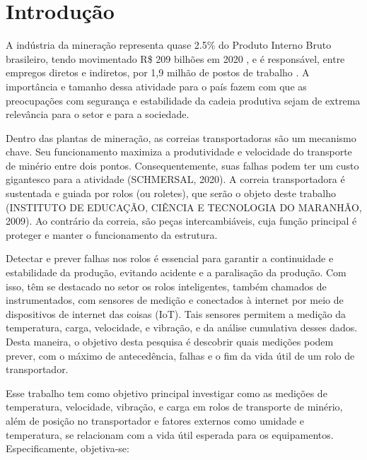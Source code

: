 
\chapter[Introdução]{Introdução}

A indústria da mineração representa quase 2.5\% do Produto Interno Bruto brasileiro, tendo movimentado R\$ 209 bilhões em 2020 \cite{governo2021}, e é responsável, entre empregos diretos e indiretos, por 1,9 milhão de postos de trabalho \cite{instituto2020}. A importância e tamanho dessa atividade para o país fazem com que as preocupações com segurança e estabilidade da cadeia produtiva sejam de extrema relevância para o setor e para a sociedade.\par
Dentro das plantas de mineração, as correias transportadoras são um mecanismo chave. Seu funcionamento maximiza a produtividade e velocidade do transporte de minério entre dois pontos. Consequentemente, suas falhas podem ter um custo gigantesco para a atividade (SCHMERSAL, 2020). A correia transportadora é sustentada e guiada por rolos (ou roletes), que serão o objeto deste trabalho (INSTITUTO DE EDUCAÇÃO, CIÊNCIA E TECNOLOGIA DO MARANHÃO, 2009). Ao contrário da correia, são peças intercambiáveis, cuja função principal é proteger e manter o funcionamento da estrutura.\par

Detectar e prever falhas nos rolos é essencial para garantir a continuidade e estabilidade da produção, evitando acidente e a paralisação da produção. Com isso, têm se destacado no setor os rolos inteligentes, também chamados de instrumentados, com sensores de medição e conectados à internet por meio de dispositivos de internet das coisas (IoT). Tais sensores permitem a medição da temperatura, carga, velocidade, e vibração, e da análise cumulativa desses dados. Desta maneira, o objetivo desta pesquisa é descobrir quais medições podem prever, com o máximo de antecedência, falhas e o fim da vida útil de um rolo de transportador.\par

Esse trabalho tem como objetivo principal investigar como as medições de temperatura, velocidade, vibração, e carga em rolos de transporte de minério, além de posição no transportador e fatores externos como umidade e temperatura, se relacionam com a vida útil esperada para os equipamentos. Especificamente, objetiva-se:\par

